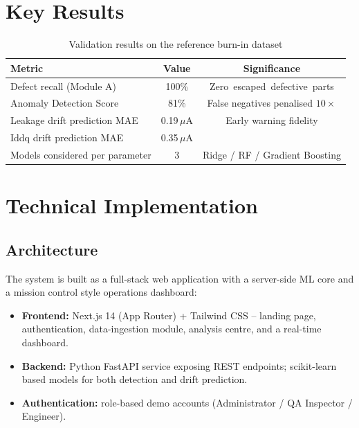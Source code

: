\documentclass[11pt,a4paper]{article}
\begin{document}
\section{Key Results}
\label{sec:results}

\begin{table}[h]
  \centering
  \caption{Validation results on the reference burn-in dataset}
  \vspace{0.3cm}
  \begin{tabular}{lcc}
    \toprule
    \textbf{Metric} & \textbf{Value} & \textbf{Significance} \\
    \midrule
    Defect recall (Module A)        & 100\%   & \mbox{Zero escaped defective parts} \\
    Anomaly Detection Score         & 81\%    & False negatives penalised $10\times$ \\
    Leakage drift prediction MAE    & 0.19\,$\mu$A & Early warning fidelity \\
    Iddq drift prediction MAE       & 0.35\,$\mu$A & \\
    Models considered per parameter & 3       & Ridge / RF / Gradient Boosting \\
    \bottomrule
  \end{tabular}
\end{table}

\section{Technical Implementation}
\label{sec:tech}

\subsection{Architecture}
The system is built as a full-stack web application with a server-side ML core and a mission
control style operations dashboard:

\begin{itemize}[leftmargin=1.5em]
  \item \textbf{Frontend:} Next.js 14 (App Router) + Tailwind CSS -- landing page,
        authentication, data-ingestion module, analysis centre, and a real-time dashboard.
  \item \textbf{Backend:} Python FastAPI service exposing REST endpoints; scikit-learn based
        models for both detection and drift prediction.
  \item \textbf{Authentication:} role-based demo accounts (Administrator / QA Inspector /
        Engineer).
\end{itemize}
\end{document}

